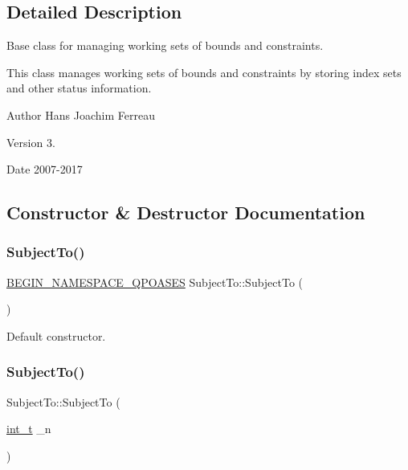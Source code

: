 \subsection{Detailed Description}
Base class for managing working sets of bounds and constraints. 

This class manages working sets of bounds and constraints by storing index sets and other status information.

\begin{DoxyAuthor}{Author}
Hans Joachim Ferreau 
\end{DoxyAuthor}
\begin{DoxyVersion}{Version}
3. 
\end{DoxyVersion}
\begin{DoxyDate}{Date}
2007-\/2017 
\end{DoxyDate}


\subsection{Constructor \& Destructor Documentation}
\mbox{\label{class_subject_to_aee0471b99a2f3b87be4c0b5a8f756752}} 
\subsubsection{\texorpdfstring{Subject\+To()}{SubjectTo()}\hspace{0.1cm}{\footnotesize\ttfamily [1/3]}}
{\footnotesize\ttfamily \hyperlink{_types_8hpp_afd127fcb3c8f47975e9fa0ec2bacde52}{B\+E\+G\+I\+N\+\_\+\+N\+A\+M\+E\+S\+P\+A\+C\+E\+\_\+\+Q\+P\+O\+A\+S\+ES} Subject\+To\+::\+Subject\+To (\begin{DoxyParamCaption}{ }\end{DoxyParamCaption})}

Default constructor. \mbox{\label{class_subject_to_adf9f182009ba07ea17dc20bd91e74b16}} 
\subsubsection{\texorpdfstring{Subject\+To()}{SubjectTo()}\hspace{0.1cm}{\footnotesize\ttfamily [2/3]}}
{\footnotesize\ttfamily Subject\+To\+::\+Subject\+To (\begin{DoxyParamCaption}\item[{\hyperlink{_types_8hpp_ab6fd6105e64ed14a0c9281326f05e623}{int\+\_\+t}}]{\+\_\+n }\end{DoxyParamCaption})}

